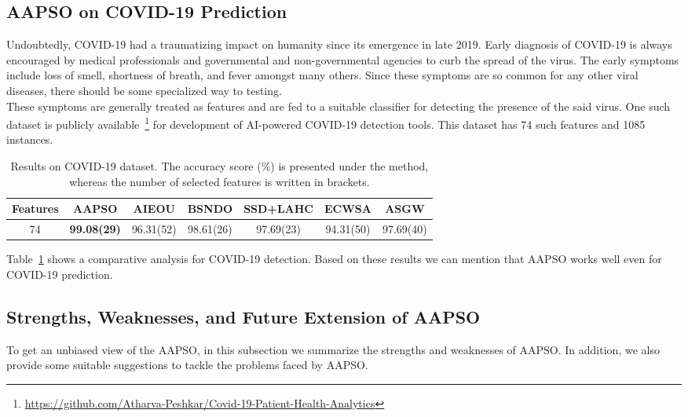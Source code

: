 \documentclass[final,3p,times]{elsarticle}
\begin{document}
\subsection{AAPSO on COVID-19 Prediction}
{Undoubtedly, COVID-19 had a traumatizing impact on humanity since its emergence in late 2019. Early diagnosis of COVID-19 is always encouraged by medical professionals and governmental and non-governmental agencies to curb the spread of the virus. The early symptoms include loss of smell, shortness of breath, and fever {amongst} many others. Since these symptoms are so common for any other viral diseases, there should be some specialized way to testing.\\
These symptoms are generally treated as features and are fed to a suitable classifier for detecting the presence of the said virus. One such dataset is publicly available~\footnote{\href{https://github.com/Atharva-Peshkar/Covid-19-Patient-Health-Analytics}{https://github.com/Atharva-Peshkar/Covid-19-Patient-Health-Analytics}} for development of AI-powered COVID-19 detection tools. This dataset has 74 such features {and} 1085 instances.}
\begin{table}[ht!]
\caption{{Results on COVID-19 dataset. The accuracy score (\%) is presented under the method, whereas the number of selected features is written in brackets.}}
    \centering
    \begin{tabular}{c|cccccc}
    \toprule
         Features& AAPSO& AIEOU	& BSNDO	& SSD+LAHC	& ECWSA	& ASGW\\
         \midrule
         74 & \textbf{99.08(29)} & 96.31(52) & 98.61(26) & 97.69(23) &94.31(50) & 97.69(40)\\
         \bottomrule
    \end{tabular}
    
    \label{tab:covid}
\end{table}
{Table~\ref{tab:covid} shows a comparative analysis for COVID-19 detection. Based on these results we can mention that AAPSO works well even for COVID-19 prediction.}
\subsection{Strengths, Weaknesses, and Future Extension of AAPSO}
{To get an unbiased view of the {AAPSO,} in this subsection we summarize the strengths and weaknesses of AAPSO. In addition, we also provide some suitable suggestions to tackle the problems faced by AAPSO.}
\end{document}
